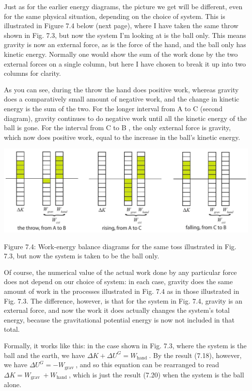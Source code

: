 \documentclass[10pt]{article}
\begin{document}
Just as for the earlier energy diagrams, the picture we get will be different, even for the same physical situation, depending on the choice of system. This is illustrated in Figure 7.4 below (next page), where I have taken the same throw shown in Fig. 7.3, but now the system I'm looking at is the ball only. This means gravity is now an external force, as is the force of the hand, and the ball only has kinetic energy. Normally one would show the sum of the work done by the two external forces on a single column, but here I have chosen to break it up into two columns for clarity.

As you can see, during the throw the hand does positive work, whereas gravity does a comparatively small amount of negative work, and the change in kinetic energy is the sum of the two. For the longer interval from A to C (second diagram), gravity continues to do negative work until all the kinetic energy of the ball is gone. For the interval from C to B , the only external force is gravity, which now does positive work, equal to the increase in the ball's kinetic energy.

\begin{center}
\includegraphics[max width=\textwidth]{2024_09_14_9969b06773f10b6936e8g-165}
\end{center}

Figure 7.4: Work-energy balance diagrams for the same toss illustrated in Fig. 7.3, but now the system is taken to be the ball only.

Of course, the numerical value of the actual work done by any particular force does not depend on our choice of system: in each case, gravity does the same amount of work in the processes illustrated in Fig. 7.4 as in those illustrated in Fig. 7.3. The difference, however, is that for the system in Fig. 7.4, gravity is an external force, and now the work it does actually changes the system's total energy, because the gravitational potential energy is now not included in that total.

Formally, it works like this: in the case shown in Fig. 7.3, where the system is the ball and the earth, we have $\Delta K+\Delta U^{G}=W_{\text {hand }}$. By the result (7.18), however, we have $\Delta U^{G}=-W_{\text {grav }}$, and so this equation can be rearranged to read $\Delta K=W_{\text {grav }}+W_{\text {hand }}$, which is just the result (7.20) when the system is the ball alone.
\end{document}

